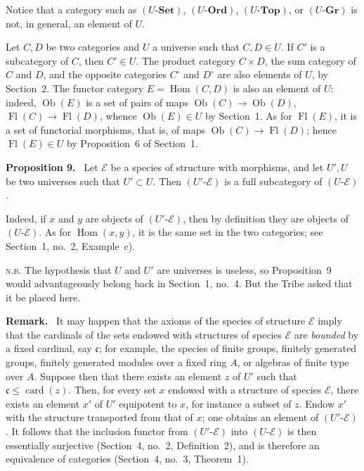 \documentclass[11pt]{article}
\newcommand{\Set}{\mathbf{Set}}
\newcommand{\Top}{\mathbf{Top}}
\newcommand{\Ord}{\mathbf{Ord}}
\newcommand{\Gr}{\mathbf{Gr}}
\newcommand{\Ob}{\operatorname{Ob}}
\newcommand{\Hom}{\operatorname{Hom}}
\newcommand{\Fl}{\operatorname{Fl}}
\newcommand{\card}{\operatorname{card}}
\newcommand{\NB}{\textsc{n.b.}}
\newenvironment{statement}[1]{\par\medskip\noindent\textbf{#1.}\ }{\par\medskip}
\newenvironment{remarktext}[1]{\par\medskip\noindent\textbf{#1.}\ }{\par\medskip}
\begin{document}
Notice that a category such as \((U\text{-}\Set)\), \((U\text{-}\Ord)\), \((U\text{-}\Top)\), or \((U\text{-}\Gr)\) is not, in general, an element of \(U\).

Let \(C,D\) be two categories and \(U\) a universe such that \(C,D\in U\). If \(C'\) is a subcategory of \(C\), then \(C'\in U\). The product category \(C\times D\), the sum category of \(C\) and \(D\), and the opposite categories \(C^\circ\) and \(D^\circ\) are also elements of \(U\), by Section~2. The functor category \(E=\Hom(C,D)\) is also an element of \(U\): indeed, \(\Ob(E)\) is a set of pairs of maps \(\Ob(C)\to\Ob(D)\), \(\Fl(C)\to\Fl(D)\), whence \(\Ob(E)\in U\) by Section~1. As for \(\Fl(E)\), it is a set of functorial morphisms, that is, of maps \(\Ob(C)\to\Fl(D)\); hence \(\Fl(E)\in U\) by Proposition~6 of Section~1.

\begin{statement}{Proposition 9}
Let \(\mathcal E\) be a species of structure with morphisms, and let \(U',U\) be two universes such that \(U'\subset U\). Then \((U'\text{-}\mathcal E)\) is a full subcategory of \((U\text{-}\mathcal E)\).
\end{statement}

Indeed, if \(x\) and \(y\) are objects of \((U'\text{-}\mathcal E)\), then by definition they are objects of \((U\text{-}\mathcal E)\). As for \(\Hom(x,y)\), it is the same set in the two categories; see Section~1, no.~2, Example~c).

\NB{} The hypothesis that \(U\) and \(U'\) are universes is useless, so Proposition~9 would advantageously belong back in Section~1, no.~4. But the Tribe asked that it be placed here.

\begin{remarktext}{Remark}
It may happen that the axioms of the species of structure \(\mathcal E\) imply that the cardinals of the sets endowed with structures of species \(\mathcal E\) are \emph{bounded} by a fixed cardinal, say \(\mathfrak c\); for example, the species of finite groups, finitely generated groups, finitely generated modules over a fixed ring \(A\), or algebras of finite type over \(A\). Suppose then that there exists an element \(z\) of \(U'\) such that \(\mathfrak c\leq\card(z)\). Then, for every set \(x\) endowed with a structure of species \(\mathcal E\), there exists an element \(x'\) of \(U'\) equipotent to \(x\), for instance a subset of \(z\). Endow \(x'\) with the structure transported from that of \(x\); one obtains an element of \((U'\text{-}\mathcal E)\). It follows that the inclusion functor from \((U'\text{-}\mathcal E)\) into \((U\text{-}\mathcal E)\) is then essentially surjective (Section~4, no.~2, Definition~2), and is therefore an equivalence of categories (Section~4, no.~3, Theorem~1).
\end{remarktext}
\end{document}
